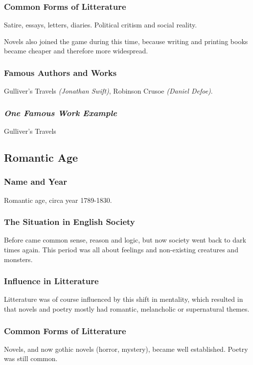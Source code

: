 \subsubsection{Common Forms of Litterature}
Satire, essays, letters, diaries. Political critism and social reality.

Novels also joined the game during this time, because writing and printing books became cheaper and therefore more widespread.

\subsubsection{Famous Authors and Works}
Gulliver's Travels \textit{(Jonathan Swift)}, Robinson Crusoe \textit{(Daniel Defoe)}.

\subsubsection{\textit{One Famous Work Example}}
Gulliver's Travels

\newpage
\subsection{Romantic Age}

\subsubsection{Name and Year}
Romantic age, circa year 1789-1830.

\subsubsection{The Situation in English Society}
Before came common sense, reason and logic, but now society went back to dark times again. This period was all about feelings and non-existing creatures and monsters.

\subsubsection{Influence in Litterature}
Litterature was of course influenced by this shift in mentality, which resulted in that novels and poetry mostly had romantic, melancholic or supernatural themes.

\subsubsection{Common Forms of Litterature}
Novels, and now gothic novels (horror, mystery), became well established. Poetry was still common.

